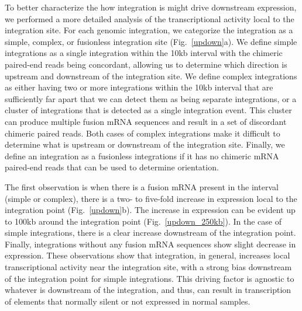 \documentclass[10pt]{article}
\begin{document}

To better characterize the how integration is might drive downstream expression, we performed a more detailed analysis of the transcriptional activity local to the integration site.  For each genomic integration, we categorize the integration as a simple, complex, or fusionless integration site (Fig.~\ref{updown}a).  We define simple integrations as a single integration within the 10kb interval with the chimeric paired-end reads being concordant, allowing us to determine which direction is upstream and downstream of the integration site.  We define complex integrations as either having two or more integrations within the 10kb interval that are sufficiently far apart that we can detect them as being separate integrations, or a cluster of integrations that is detected as a single integration event.  This cluster can produce multiple fusion mRNA sequences and result in a set of discordant chimeric paired reads.  Both cases of complex integrations make it difficult to determine what is upstream or downstream of the integration site.  Finally, we define an integration as a fusionless integrations if it has no chimeric mRNA paired-end reads that can be used to determine orientation.

The first observation is when there is a fusion mRNA present in the interval (simple or complex), there is a two- to five-fold increase in expression local to the integration point (Fig.~\ref{updown}b).  The increase in expression can be evident up to 100kb around the integration point (Fig.~\ref{updown_250kb}).  In the case of simple integrations, there is a clear increase downstream of the integration point.  Finally, integrations without any fusion mRNA sequences show slight decrease in expression.  These observations show that integration, in general, increases local transcriptional activity near the integration site, with a strong bias downstream of the integration point for simple integrations.  This driving factor is agnostic to whatever is downstream of the integration, and thus, can result in transcription of elements that normally silent or not expressed in normal samples. 
\end{document}
